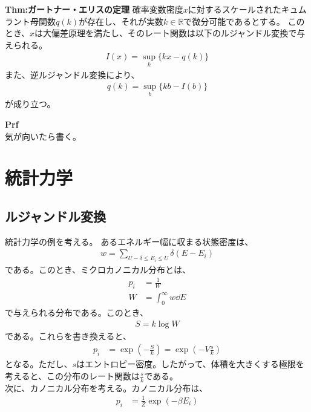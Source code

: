 \documentclass[a4paper,11pt]{jsarticle}
\numberwithin{equation}{section}
\begin{document}
  \begin{itembox}[l]{\textbf{Thm:ガートナー・エリスの定理}}
    確率変数密度$x$に対するスケールされたキュムラント母関数$q(k)$が存在し、それが実数$k \in \mathbb{R}$で微分可能であるとする。
    このとき、$x$は大偏差原理を満たし、そのレート関数は以下のルジャンドル変換で与えられる。
    \begin{align}
      I(x) = \sup_{k} \{kx - q(k)\}
    \end{align}
    また、逆ルジャンドル変換により、
    \begin{align}
      q(k) = \sup_{b} \{kb - I(b)\}
    \end{align}
    が成り立つ。
  \end{itembox}
  \textbf{Prf}\\
  気が向いたら書く。

\section{統計力学}
\subsection{ルジャンドル変換}
統計力学の例を考える。
あるエネルギー幅に収まる状態密度は、
\begin{align}
  w = \sum_{U-\delta \leq E_i \leq U}\delta(E-E_{i})
\end{align}
である。このとき、ミクロカノニカル分布とは、
\begin{align}
  p_i &= \frac{1}{W} \\
  W &= \int_{0}^{\infty} w \dd E
\end{align}
で与えられる分布である。このとき、
\begin{align}
  S = k \log W
\end{align}
である。これらを書き換えると、
\begin{align}
  p_i &= \exp(-\frac{S}{k}) = \exp(-V \frac{s}{k})
\end{align}
となる。ただし、$s$はエントロピー密度。したがって、体積を大きくする極限を考えると、この分布のレート関数は$\frac{s}{k}$である。\\
次に、カノニカル分布を考える。カノニカル分布は、
\begin{align}
  p_i &= \frac{1}{Z} \exp(-\beta E_i)
\end{align}
\end{document}

